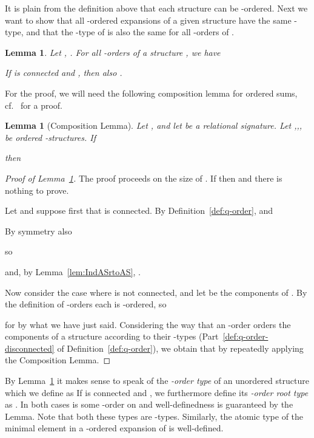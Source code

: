\documentclass[11pt]{article}
\newtheorem{lemma}[theorem]{Lemma}
\begin{document}
It is plain from the definition above that each structure can be
-ordered. Next we want to show that all -ordered expansions
 of a given structure  have the same -type, and
that the -type of  is also the same
for all -orders  of .

\begin{lemma}
  \label{lem:all-q-orders-are-equivalent}
  Let , . For all
  -orders  of a structure , we have
  
  If  is connected and
  , then also .
\end{lemma}

For the proof, we will need the following composition lemma for
ordered sums, cf.~\cite{Makowsky2004} for a proof.

\begin{lemma}[Composition Lemma]
  \label{lem:ordered-comp-lemma}
  Let ,  and let  be a
  relational signature.  Let ,,,
  be ordered -structures. If 
  
  then
  
\end{lemma}

\begin{proof}[Proof of Lemma~\ref{lem:all-q-orders-are-equivalent}]
  The proof proceeds on the size of . If  then
   and there is nothing to prove.

  Let  and suppose first that  is connected. By
  Definition~\ref{def:q-order},
   and
  
  By symmetry also
  
  so
  
  and, by Lemma~\ref{lem:IndASrtoAS}, .

  Now consider the case where  is not connected, and let
   be the components of .
  By the definition of -orders each  is -ordered, so
  
  for  by what we have just said. Considering the
  way that an -order orders the components of a structure
  according to their -types
  (Part~\ref{def:q-order-disconnected} of
  Definition~\ref{def:q-order}), we obtain that  by repeatedly applying the
  Composition Lemma.
\end{proof}

By Lemma~\ref{lem:all-q-orders-are-equivalent} it makes sense to speak
of the \emph{-order type} of an unordered structure  which we
define as 
If  is connected and , we furthermore define its
\emph{-order root type} as . 
In both cases  is some -order on  and
well-definedness is guaranteed by the Lemma. Note that both these
types are -types. Similarly, the atomic type  of the minimal element in a -ordered expansion of  is 
well-defined.
\end{document}
